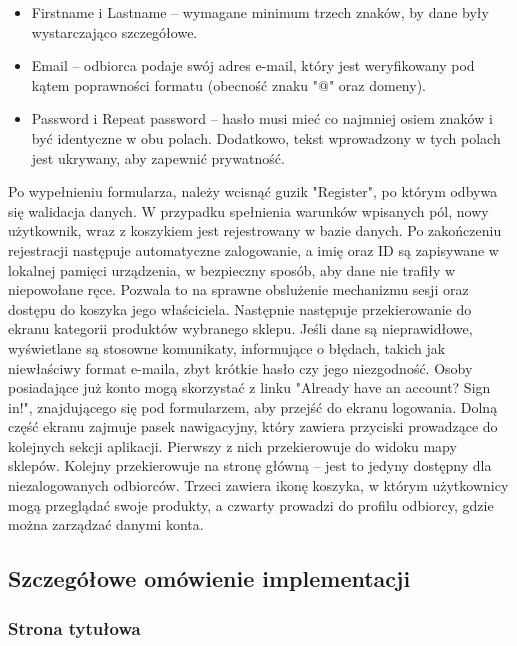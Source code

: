 \begin{itemize} \item Firstname i Lastname – wymagane minimum trzech znaków, by dane były wystarczająco szczegółowe. \item Email – odbiorca podaje swój adres e-mail, który jest weryfikowany pod kątem poprawności formatu (obecność znaku "@" oraz domeny). \item Password i Repeat password – hasło musi mieć co najmniej osiem znaków i być identyczne w obu polach. Dodatkowo, tekst wprowadzony w tych polach jest ukrywany, aby zapewnić prywatność. \end{itemize}

Po wypełnieniu formularza, należy wcisnąć guzik "Register", po którym odbywa się walidacja danych. W przypadku spełnienia warunków wpisanych pól, nowy użytkownik, wraz z koszykiem jest rejestrowany w bazie danych. Po zakończeniu rejestracji następuje automatyczne zalogowanie, a imię oraz ID są zapisywane w lokalnej pamięci urządzenia, w bezpieczny sposób, aby dane nie trafiły w niepowołane ręce. Pozwala to na sprawne obslużenie mechanizmu sesji oraz dostępu do koszyka jego właściciela. Następnie następuje przekierowanie do ekranu kategorii produktów wybranego sklepu. Jeśli dane są nieprawidłowe, wyświetlane są stosowne komunikaty, informujące o błędach, takich jak niewłaściwy format e-maila, zbyt krótkie hasło czy jego niezgodność. Osoby posiadające już konto mogą skorzystać z linku "Already have an account? Sign in!", znajdującego się pod formularzem, aby przejść do ekranu logowania. Dolną część ekranu zajmuje pasek nawigacyjny, który zawiera przyciski prowadzące do kolejnych sekcji aplikacji. Pierwszy z nich przekierowuje do widoku mapy sklepów. Kolejny przekierowuje na stronę główną – jest to jedyny dostępny dla niezalogowanych odbiorców. Trzeci zawiera ikonę koszyka, w którym użytkownicy mogą przeglądać swoje produkty, a czwarty prowadzi do profilu odbiorcy, gdzie można zarządzać danymi konta.

\subsection{Szczegółowe omówienie implementacji}
\subsubsection{Strona tytułowa}